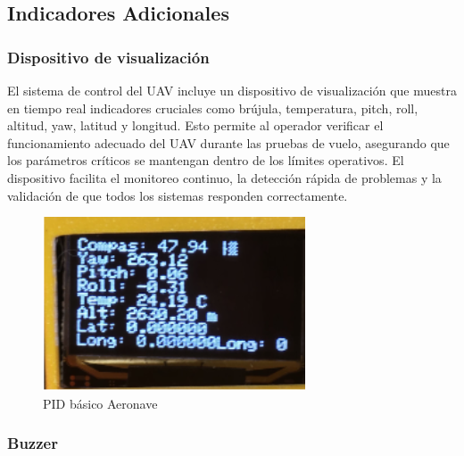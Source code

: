     \subsection{Indicadores Adicionales}
        \subsubsection{Dispositivo de visualización}
            El sistema de control del UAV incluye un dispositivo de visualización que muestra en tiempo real indicadores cruciales como brújula, temperatura, pitch, roll, altitud, yaw, latitud y longitud. Esto permite al operador verificar el funcionamiento adecuado del UAV durante las pruebas de vuelo, asegurando que los parámetros críticos se mantengan dentro de los límites operativos. El dispositivo facilita el monitoreo continuo, la detección rápida de problemas y la validación de que todos los sistemas responden correctamente.
            \begin{figure}[H]
                \centering
                \includegraphics[width=\textwidth]{Imagenes/Firmware/Pantalla oled.png}
                \caption{PID básico Aeronave }
                \label{fig:mov-Superficies }
            \end{figure}

        \subsubsection{Buzzer}

